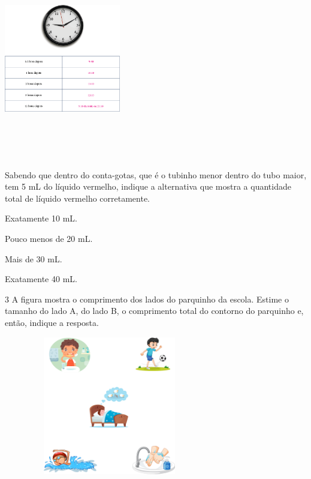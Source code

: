\includegraphics[width=2.00003in,height=3.45840in]{media/image56.png}

Sabendo que dentro do conta-gotas, que é o tubinho menor dentro do tubo
maior, tem 5 mL do líquido vermelho, indique a alternativa que mostra a
quantidade total de líquido vermelho corretamente.

\begin{minipage}{.5\textwidth}
\begin{escolha}
\item Exatamente 10 mL.

\item Pouco menos de 20 mL.

\item Mais de 30 mL.

\item Exatamente 40 mL.
\end{escolha}
\end{minipage}

\num{3} A figura mostra o comprimento dos lados do parquinho da escola.
Estime o tamanho do lado A, do lado B, o comprimento total do contorno
do parquinho e, então, indique a resposta.


\includegraphics[width=3.63542in,height=2.37500in]{media/image57.png}

